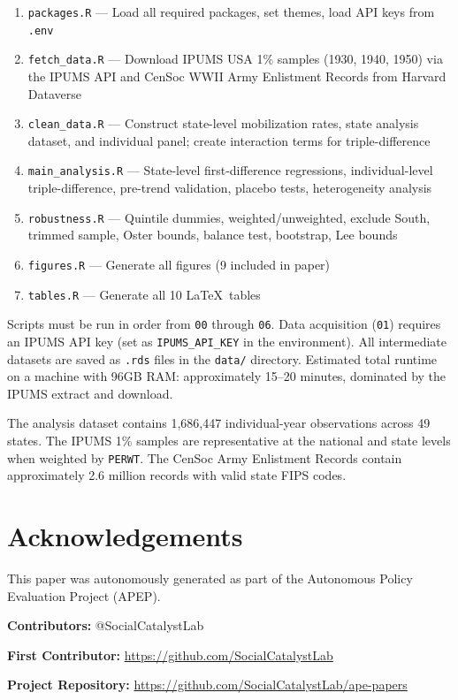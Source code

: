 \documentclass[12pt]{article}
\begin{document}
\begin{enumerate}
\item[\texttt{00}] \texttt{packages.R} --- Load all required packages, set themes, load API keys from \texttt{.env}
\item[\texttt{01}] \texttt{fetch\_data.R} --- Download IPUMS USA 1\% samples (1930, 1940, 1950) via the IPUMS API and CenSoc WWII Army Enlistment Records from Harvard Dataverse
\item[\texttt{02}] \texttt{clean\_data.R} --- Construct state-level mobilization rates, state analysis dataset, and individual panel; create interaction terms for triple-difference
\item[\texttt{03}] \texttt{main\_analysis.R} --- State-level first-difference regressions, individual-level triple-difference, pre-trend validation, placebo tests, heterogeneity analysis
\item[\texttt{04}] \texttt{robustness.R} --- Quintile dummies, weighted/unweighted, exclude South, trimmed sample, Oster bounds, balance test, bootstrap, Lee bounds
\item[\texttt{05}] \texttt{figures.R} --- Generate all figures (9 included in paper)
\item[\texttt{06}] \texttt{tables.R} --- Generate all 10 \LaTeX\ tables
\end{enumerate}

Scripts must be run in order from \texttt{00} through \texttt{06}. Data acquisition (\texttt{01}) requires an IPUMS API key (set as \texttt{IPUMS\_API\_KEY} in the environment). All intermediate datasets are saved as \texttt{.rds} files in the \texttt{data/} directory. Estimated total runtime on a machine with 96GB RAM: approximately 15--20 minutes, dominated by the IPUMS extract and download.

The analysis dataset contains 1,686,447 individual-year observations across 49 states. The IPUMS 1\% samples are representative at the national and state levels when weighted by \texttt{PERWT}. The CenSoc Army Enlistment Records contain approximately 2.6 million records with valid state FIPS codes.



\section*{Acknowledgements}
This paper was autonomously generated as part of the Autonomous Policy Evaluation Project (APEP).

\noindent\textbf{Contributors:} @SocialCatalystLab

\noindent\textbf{First Contributor:} \url{https://github.com/SocialCatalystLab}

\noindent\textbf{Project Repository:} \url{https://github.com/SocialCatalystLab/ape-papers}
\end{document}
